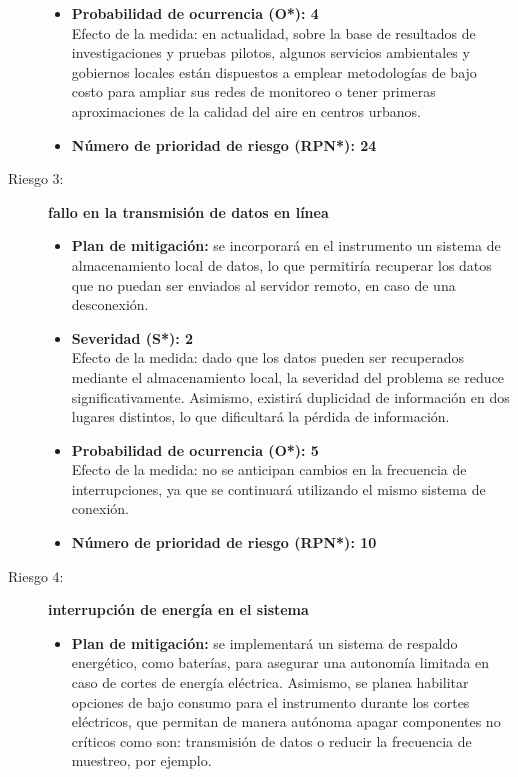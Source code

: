 \begin{description}
\begin{itemize}
		\item \textbf{Probabilidad de ocurrencia (O*): 4} \\
		Efecto de la medida: en actualidad, sobre la base de resultados de investigaciones y pruebas pilotos, algunos servicios ambientales y gobiernos locales están dispuestos a emplear metodologías de bajo costo para ampliar sus redes de monitoreo o tener primeras aproximaciones de la calidad del aire en centros urbanos.
		\item \textbf{Número de prioridad de riesgo (RPN*): 24}
	\end{itemize}    
	
	\item[Riesgo 3:] \textbf{{fallo en la transmisión de datos en línea}}
	\begin{itemize}
		\item \textbf{Plan de mitigación:} se incorporará en el instrumento un sistema de almacenamiento local de datos, lo que permitiría recuperar los datos que no puedan ser enviados al servidor remoto, en caso de una desconexión.
		
		\item \textbf{Severidad (S*): 2} \\
		Efecto de la medida: dado que los datos pueden ser recuperados mediante el almacenamiento local, la severidad del problema se reduce significativamente. Asimismo, existirá duplicidad de información en dos lugares distintos, lo que dificultará la pérdida de información.
		\item \textbf{Probabilidad de ocurrencia (O*): 5} \\
		Efecto de la medida: no se anticipan cambios en la frecuencia de interrupciones, ya que se continuará utilizando el mismo sistema de conexión.
		
		\item \textbf{Número de prioridad de riesgo (RPN*): 10}
	\end{itemize}
	
	\item[Riesgo 4:] \textbf{{interrupción de energía en el sistema}}
	\begin{itemize}
		\item \textbf{Plan de mitigación:} se implementará un sistema de respaldo energético, como baterías, para asegurar una autonomía limitada en caso de cortes de energía eléctrica. Asimismo, se planea habilitar opciones de bajo consumo para el instrumento durante los cortes eléctricos, que permitan de manera autónoma apagar componentes no críticos como son: transmisión de datos o reducir la frecuencia de muestreo, por ejemplo.
		

\end{itemize}
\end{description}
